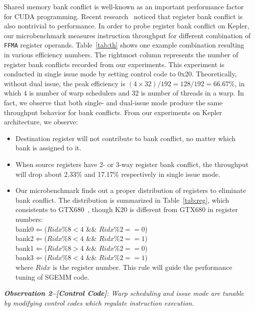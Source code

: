 Shared memory bank conflict is well-known as an important performance factor for CUDA programming.
Recent research~\cite{lai} noticed that register bank conflict is also nontrivial to performance.
In order to probe
register bank conflict on Kepler, our microbenchmark measures instruction throughput for different combination of {\tt FFMA}
register operands.
Table~\ref{tab:th} shows one example combination resulting in various efficiency numbers.
The rightmost column represents the number of register bank conflicts recorded from our experiments.
This experiment is conducted in single issue mode by setting control code to 0x20.
Theoretically, without dual issue, the peak efficiency is $(4\times32)/192=128/192=66.67\%$, in which $4$ is number of warp schedulers and $32$
is number of threads in a warp.
In fact, we observe that both single- and dual-issue mode produce the same throughput behavior for bank conflicts.
From our experiments on Kepler architecture, we observe:
\begin{itemize}
\item Destination register will not contribute to bank conflict, no matter which bank is assigned to it.
\item When source registers have 2- or 3-way register bank conflict, the throughput will drop about 2.33\% and 17.17\% respectively in single issue mode.
\item Our microbenchmark finds out a proper distribution of registers to eliminate bank conflict.
     The distribution is summarized in Table~\ref{tab:reg}, which consistents to GTX680~\cite{lai}, though K20 is
        different from GTX680 in register numbers: \\
 bank0$\Leftarrow$($Ridx \% 8 < 4$ \&\& $Ridx \% 2 == 0$) \\
 bank2$\Leftarrow$($Ridx \% 8 < 4$ \&\& $Ridx \% 2 == 1$) \\
bank1$\Leftarrow$($Ridx \% 8 > 4$ \&\& $Ridx \%2 == 0$) \\
bank3$\Leftarrow$($Ridx \% 8 < 4$ \&\& $Ridx\% 2 == 1$)\\
where $Ridx$ is the register number.
This rule will guide the performance tuning of SGEMM code.

\end{itemize}


{\em {\bf Observation 2--[Control Code]}:
Warp scheduling and issue mode are tunable by modifying control codes which regulate instruction execution.}

